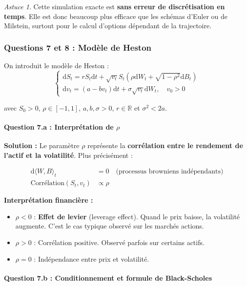 \documentclass[12pt,a4paper]{article}
\theoremstyle{definition}
\theoremstyle{remark}
\newtheorem*{astuce}{Astuce}
\newcommand{\R}{\mathbb{R}}
\newcommand{\dd}{\mathrm{d}}
\begin{document}
\begin{astuce}
Cette simulation exacte est \textbf{sans erreur de discrétisation en temps}. Elle est donc beaucoup plus efficace que les schémas d'Euler ou de Milstein, surtout pour le calcul d'options dépendant de la trajectoire.
\end{astuce}

\subsubsection{Questions 7 et 8 : Modèle de Heston}

On introduit le modèle de Heston :
\begin{equation}
\begin{cases}
\dd S_t = rS_t\dd t + \sqrt{v_t}S_t(\rho \dd W_t + \sqrt{1-\rho^2}\dd B_t) \\
\dd v_t = (a - bv_t)\dd t + \sigma\sqrt{v_t}\dd W_t, \quad v_0 > 0
\end{cases}
\end{equation}

avec $S_0 > 0$, $\rho \in [-1,1]$, $a, b, \sigma > 0$, $r \in \R$ et $\sigma^2 < 2a$.

\paragraph{Question 7.a : Interprétation de $\rho$}

\textbf{Solution :} Le paramètre $\rho$ représente la \textbf{corrélation entre le rendement de l'actif et la volatilité}. Plus précisément :

\begin{align*}
\dd\langle W, B \rangle_t &= 0 \quad \text{(processus browniens indépendants)} \\
\text{Corrélation}(S_t, v_t) &\propto \rho
\end{align*}

\textbf{Interprétation financière :}
\begin{itemize}
\item $\rho < 0$ : \textbf{Effet de levier} (leverage effect). Quand le prix baisse, la volatilité augmente. C'est le cas typique observé sur les marchés actions.
\item $\rho > 0$ : Corrélation positive. Observé parfois sur certains actifs.
\item $\rho = 0$ : Indépendance entre prix et volatilité.
\end{itemize}

\paragraph{Question 7.b : Conditionnement et formule de Black-Scholes}
\end{document}
